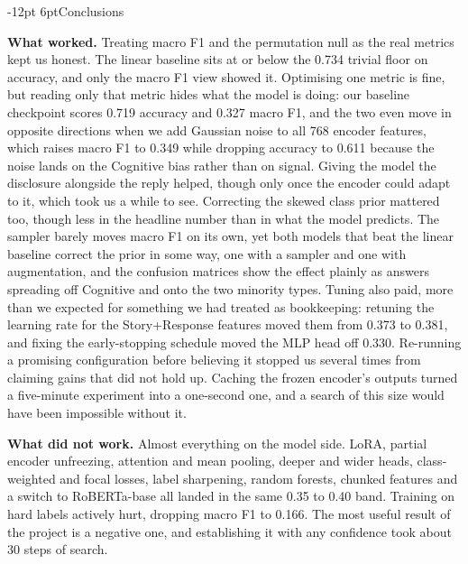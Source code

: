 \documentclass[11pt,a4paper]{article}
\makeatletter
\renewcommand\section{\@startsection{section}{1}{\z@}%
  {-12pt \@plus -3pt \@minus -2pt}{6pt}{\normalfont\large\bfseries}}
\makeatother
\begin{document}
\section{Conclusions}

\textbf{What worked.} Treating macro F1 and the permutation null as the real metrics kept
us honest. The linear baseline sits at or below the 0.734 trivial floor on accuracy, and only
the macro F1 view showed it. Optimising one metric is fine, but reading only that metric
hides what the model is doing: our baseline checkpoint scores 0.719 accuracy and 0.327 macro
F1, and the two even move in opposite directions when we add Gaussian noise to all 768
encoder features, which raises macro F1 to 0.349 while dropping accuracy to 0.611 because the
noise lands on the Cognitive bias rather than on signal. Giving the model the disclosure
alongside the reply helped, though only once the encoder could adapt to it, which took us a
while to see. Correcting the skewed class prior mattered too, though less in the headline
number than in what the model predicts. The sampler barely moves macro F1 on its own, yet
both models that beat the linear baseline correct the prior in some way, one with a sampler
and one with augmentation, and the confusion matrices show the effect plainly as answers
spreading off Cognitive and onto the two minority types. Tuning also paid, more than we expected for something we had treated as
bookkeeping: retuning the learning rate for the Story+Response features moved them from
0.373 to 0.381, and fixing the early-stopping schedule moved the MLP head off 0.330.
Re-running a promising configuration before believing it stopped us several times from
claiming gains that did not hold up. Caching the frozen encoder's outputs turned
a five-minute experiment into a one-second one, and a search of this size would have been
impossible without it.

\textbf{What did not work.} Almost everything on the model side. LoRA, partial encoder
unfreezing, attention and mean pooling, deeper and wider heads, class-weighted and focal
losses, label sharpening, random forests, chunked features and a switch to RoBERTa-base all
landed in the same 0.35 to 0.40 band. Training on hard labels actively hurt, dropping macro
F1 to 0.166. The most useful result of the project is a negative one, and establishing it
with any confidence took about 30 steps of search.
\end{document}
